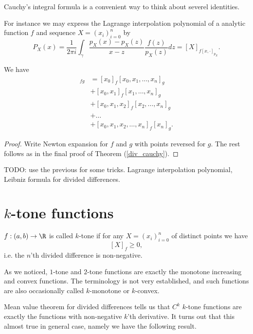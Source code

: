 Cauchy's integral formula is a convenient way to think about severel identities.

\begin{esim}
For instance we may express the Lagrange interpolation polynomial of a analytic function $f$ and sequence $X = (x_{i})_{i = 0}^{n}$ by
\[
	P_{X}(x) = \frac{1}{2 \pi i} \int_{\gamma} \frac{p_{X}(x) - p_{X}(z)}{x - z}\frac{f(z)}{p_{X}(z)} dz = [X]_{f [x, \cdot]_{p_{X}}}.
\]
\end{esim}

\begin{prop}
	We have
	\begin{align*}
		[x_{0}, x_{1}, \ldots, x_{n}]_{f g} &= [x_{0}]_{f} [x_{0}, x_{1}, \ldots, x_{n}]_{g} \\
		&+ [x_{0}, x_{1}]_{f} [x_{1}, \ldots, x_{n}]_{g} \\
		&+ [x_{0}, x_{1}, x_{2}]_{f} [x_{2}, \ldots, x_{n}]_{g} \\
		&+ \ldots \\
		&+ [x_{0}, x_{1}, x_{2}, \ldots, x_{n}]_{f} [x_{n}]_{g}.
	\end{align*}
\end{prop}
\begin{proof}
	Write Newton expansion for $f$ and $g$ with points reversed for $g$. The rest follows as in the final proof of Theorem (\ref{div_cauchy}).
\end{proof}

TODO: use the previous for some tricks. Lagrange interpolation polynomial, Leibniz formula for divided differences.

\section{$k$-tone functions}

\begin{maar}
	$f : (a, b) \to \R$ is called $k$-tone if for any $X = (x_{i})_{i = 0}^{n}$ of distinct points we have
	\[
		[X]_{f} \geq 0,
	\]
	i.e. the $n$'th divided difference is non-negative.
\end{maar}

As we noticed, $1$-tone and $2$-tone functions are exactly the monotone increasing and convex functions. The terminology is not very established, and such functions are also occasionally called $k$-monotone or $k$-convex.

Mean value theorem for divided differences tells us that $C^{k}$ $k$-tone functions are exactly the functions with non-negative $k$'th derivative. It turns out that this almost true in general case, namely we have the following result.

